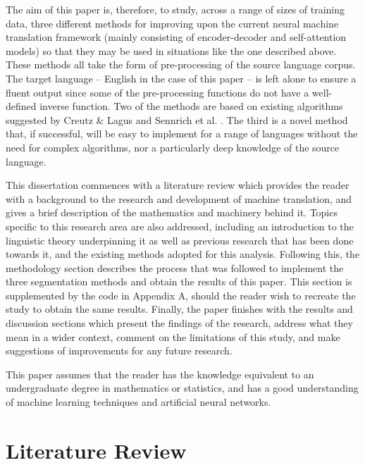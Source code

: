 \documentclass[11pt]{article}
\begin{document}
The aim of this paper is, therefore, to study, across a range of sizes of training data, three different methods for improving upon the current neural machine translation framework (mainly consisting of encoder-decoder and self-attention models) so that they may be used in situations like the one described above. These methods all take the form of pre-processing of the source language corpus. The target language -- English in the case of this paper -- is left alone to ensure a fluent output since some of the pre-processing functions do not have a well-defined inverse function. Two of the methods are based on existing algorithms suggested by Creutz \& Lagus \citeyearpar{creutz-lagus-2002-unsupervised} and Sennrich et al. \citeyearpar{sennrich-etal-2016-neural}. The third is a novel method that, if successful, will be easy to implement for a range of languages without the need for complex algorithms, nor a particularly deep knowledge of the source language.

\bigskip

This dissertation commences with a literature review which provides the reader with a background to the research and development of machine translation, and gives a brief description of the mathematics and machinery behind it. Topics specific to this research area are also addressed, including an introduction to the linguistic theory underpinning it as well as previous research that has been done towards it, and the existing methods adopted for this analysis. Following this, the methodology section describes the process that was followed to implement the three segmentation methods and obtain the results of this paper. This section is supplemented by the code in Appendix A, should the reader wish to recreate the study to obtain the same results. Finally, the paper finishes with the results and discussion sections which present the findings of the research, address what they mean in a wider context, comment on the limitations of this study, and make suggestions of improvements for any future research.

\bigskip

This paper assumes that the reader has the knowledge equivalent to an undergraduate degree in mathematics or statistics, and has a good understanding of machine learning techniques and artificial neural networks.

\section{Literature Review}
\end{document}
